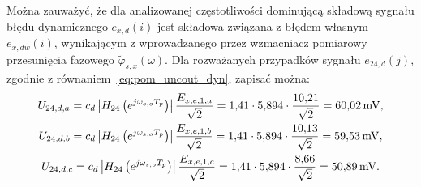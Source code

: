 Można zauważyć, że dla analizowanej częstotliwości dominującą składową sygnału błędu dynamicznego $e_{x,d}(i)$ jest składowa związana z błędem własnym $e_{x,dw}(i)$, wynikającym z wprowadzanego przez wzmacniacz pomiarowy przesunięcia fazowego $\tilde{\varphi}_{s,x}(\omega)$. Dla rozważanych przypadków sygnału $e_{24,d}(j)$, zgodnie z równaniem~\eqref{eq:pom_uncout_dyn}, zapisać można:
\begin{gather}
U_{24,d,a} = c_{d} \left| H_{24} \left(e^{j \omega_{s,o} T_{p}}\right) \right| \frac{E_{x,e,1,a}}{\sqrt{2}} = \num{1.41} \cdot \num{5.894} \cdot \frac{\num{10.21}}{\sqrt{2}} = \qty{60.02}{mV} \label{eq:pom_mono_dyn_unc_a}, \\
U_{24,d,b} = c_{d} \left| H_{24} \left(e^{j \omega_{s,o} T_{p}}\right) \right| \frac{E_{x,e,1,b}}{\sqrt{2}} = \num{1.41} \cdot \num{5.894} \cdot \frac{\num{10.13}}{\sqrt{2}} = \qty{59.53}{mV} \label{eq:pom_mono_dyn_unc_b}, \\
U_{24,d,c} = c_{d} \left| H_{24} \left(e^{j \omega_{s,o} T_{p}}\right) \right| \frac{E_{x,e,1,c}}{\sqrt{2}} = \num{1.41} \cdot \num{5.894} \cdot \frac{\num{8.66}}{\sqrt{2}} = \qty{50.89}{mV} \label{eq:pom_mono_dyn_unc_c}.
\end{gather}

